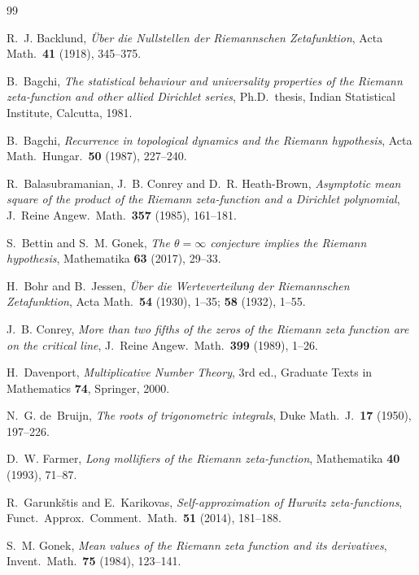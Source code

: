 \documentclass[11pt]{amsart}
\theoremstyle{plain}
\theoremstyle{definition}
\theoremstyle{remark}
\begin{document}
\begin{thebibliography}{99}

R.~J. Backlund, \emph{\"Uber die Nullstellen der Riemannschen Zetafunktion}, Acta Math.\ \textbf{41} (1918), 345--375.

B.~Bagchi, \emph{The statistical behaviour and universality properties of the Riemann zeta-function and other allied Dirichlet series}, Ph.D.\ thesis, Indian Statistical Institute, Calcutta, 1981.

B.~Bagchi, \emph{Recurrence in topological dynamics and the Riemann hypothesis}, Acta Math.\ Hungar.\ \textbf{50} (1987), 227--240.

R.~Balasubramanian, J.~B. Conrey and D.~R. Heath-Brown, \emph{Asymptotic mean square of the product of the Riemann zeta-function and a Dirichlet polynomial}, J.~Reine Angew.\ Math.\ \textbf{357} (1985), 161--181.

S.~Bettin and S.~M. Gonek, \emph{The $\theta=\infty$ conjecture implies the Riemann hypothesis}, Mathematika \textbf{63} (2017), 29--33.

H.~Bohr and B.~Jessen, \emph{\"Uber die Werteverteilung der Riemannschen Zetafunktion}, Acta Math.\ \textbf{54} (1930), 1--35; \textbf{58} (1932), 1--55.

J.~B. Conrey, \emph{More than two fifths of the zeros of the Riemann zeta function are on the critical line}, J.~Reine Angew.\ Math.\ \textbf{399} (1989), 1--26.

H.~Davenport, \emph{Multiplicative Number Theory}, 3rd ed., Graduate Texts in Mathematics \textbf{74}, Springer, 2000.

N.~G. de~Bruijn, \emph{The roots of trigonometric integrals}, Duke Math.\ J.\ \textbf{17} (1950), 197--226.

D.~W. Farmer, \emph{Long mollifiers of the Riemann zeta-function}, Mathematika \textbf{40} (1993), 71--87.

R.~Garunk\v stis and E.~Karikovas, \emph{Self-approximation of Hurwitz zeta-functions}, Funct.\ Approx.\ Comment.\ Math.\ \textbf{51} (2014), 181--188.

S.~M. Gonek, \emph{Mean values of the Riemann zeta function and its derivatives}, Invent.\ Math.\ \textbf{75} (1984), 123--141.


\end{thebibliography}
\end{document}

